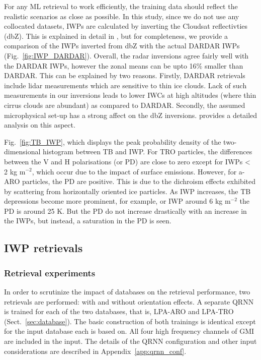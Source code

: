 \documentclass[amt, manuscript]{copernicus}
\begin{document}
For any ML retrieval to work efficiently, the training data should reflect the realistic scenarios as close as possible. In this study, since we do not use any collocated datasets, IWPs are calculated by inverting the Cloudsat reflectivties (dbZ). This is explained in detail in \citet{ekelund2020using}, but for completeness, we provide a comparison of the IWPs inverted from dbZ with the actual DARDAR IWPs (Fig.~\ref{fig:IWP_DARDAR}). Overall, the radar inversions agree
fairly well with the DARDAR IWPs, however the zonal means can be upto 16\% smaller than DARDAR.  This can be explained by two reasons. Firstly, DARDAR retrievals include lidar measurements which are sensitive to thin ice clouds. Lack of such measurements in our inversions leads to lower IWCs at high altitudes (where thin cirrus clouds are abundant) as compared to DARDAR. Secondly, the assumed microphysical set-up has a strong affect on the dbZ inversions.  \citet{ekelund2020using} provides a detailed analysis on this aspect.

Fig.~\ref{fig:TB_IWP}, which displays the peak probability density of the two-dimensional histogram between TB and IWP. For TRO particles, the differences between the V  and H  polarisations (or PD) are close to zero except for IWPs < 2\,\,kg m$^{-2}$, which occur due to the impact of surface emissions. However, for a-ARO particles, the PD are positive. This is due to the dichroism effects exhibited by scattering from horizontally oriented ice particles. As IWP increases, the TB depressions become more prominent, for example, or IWP around 6\,\,kg m$^{-2}$ the PD is around 25\,\,K. But the PD do not increase drastically with an increase in the IWPs, but instead, a saturation in the PD is seen. 

\subsection{IWP retrievals}
%
\label{sec:iwp_retrievals}

\subsubsection{Retrieval experiments}
%
\label{sec:ret_expts}
In order to scrutinize the impact of databases on the retrieval performance, two retrievals are performed: with and without orientation effects. A separate QRNN is trained for each of the two databases, that is, LPA-ARO and LPA-TRO (Sect.~\ref{sec:database}). The basic construction of both trainings is identical except for the input database each is based on. All four high frequency channels of GMI are included in the input. The details of the QRNN configuration and other input considerations are described in  Appendix~\ref{app:qrnn_conf}.  
\end{document}
